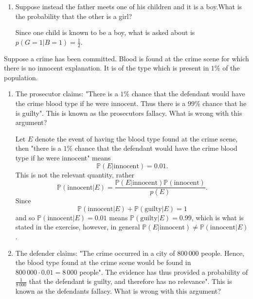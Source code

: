 \begin{example}
\begin{enumerate}
		\item Suppose instead the father meets one of his children and it is a boy.What is the probability that the other is a girl?
		
		Since one child is known to be a boy, what is asked about is $p(G=1|B=1)=\frac{1}{2}$.
	\end{enumerate}
\end{example}

\begin{example}
	Suppose a crime has been committed. Blood is found at the crime scene for which there is no innocent explanation. It is of the type which is present in $1\%$ of the population.
	
	\begin{enumerate}
		\item The prosecutor claims: "There is a $1\%$ chance that the defendant would have the crime blood type if he were innocent. Thus there is a $99\%$ chance that he is guilty". This is known as the prosecutors fallacy. What is wrong with this argument?
		
		Let $E$ denote the event of having the blood type found at the crime scene, then "there is a $1\%$ chance that the defendant would have the crime blood type if he were innocent" means
		\begin{equation}
			\mathbb{P}(E|\text{innocent})=0.01.
		\end{equation}
		This is not the relevant quantity, rather
		\begin{equation}
			\mathbb{P}(\text{innocent}|E)=\frac{\mathbb{P}(E|\text{innocent})\mathbb{P}(\text{innocent})}{p(E)}.
		\end{equation}
		Since
		\begin{equation}
			\mathbb{P}(\text{innocent}|E)+\mathbb{P}(\text{guilty}|E)=1
		\end{equation}
		and so $\mathbb{P}(\text{innocent}|E)=0.01$ means $\mathbb{P}(\text{guilty}|E)=0.99$, which is what is stated in the exercise, however, in general \(\mathbb{P}(E|\text{innocent})\neq \mathbb{P}(\text{innocent}|E)\).
		
		\item The defender claims: "The crime occurred in a city of $800\, 000$ people. Hence, the blood type found at the crime scene would be found in $800\, 000 \cdot 0.01=8\, 000$ people". The evidence has thus provided a probability of $\frac{1}{8\, 000}$ that the defendant is guilty, and therefore has no relevance". This is known as the defendants fallacy. What is wrong with this argument?
		

\end{enumerate}
\end{example}
